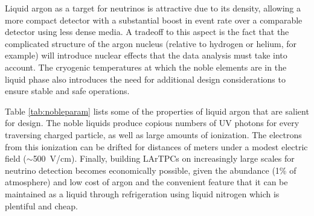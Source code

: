 
Liquid argon as a target for neutrinos is attractive due to its density, allowing a more compact detector with a substantial boost in event rate over a comparable detector using less dense media.  A tradeoff to this aspect is the fact that the complicated structure of the argon nucleus (relative to hydrogen or helium, for example) will introduce nuclear effects that the data analysis must take into account.  The cryogenic temperatures at which the noble elements are in the liquid phase also introduces the need for additional design considerations to ensure stable and safe operations.

Table \ref{tab:nobleparam} lists some of the properties of liquid argon that are salient for \lartpc design.  
The noble liquids produce copious numbers of UV photons for every traversing charged particle, as well as large amounts of ionization.  The electrons from this ionization can be drifted for distances of meters under a modest electric field ($\sim$500~V/cm).  Finally, building LArTPCs on increasingly large scales for neutrino detection becomes economically possible, given the abundance (1\% of atmosphere) and low cost of argon and the convenient feature that it can be maintained as a liquid through refrigeration using liquid nitrogen which is plentiful and cheap.    


